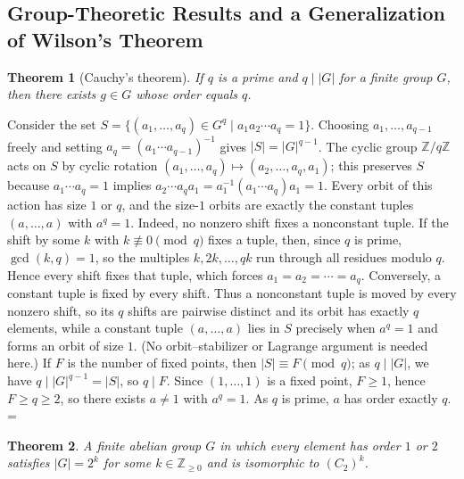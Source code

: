\documentclass[11pt]{article}
\makeatletter
\let\nt@closedisplay\]
\def\nt@guardedclose{\@ifnextchar\par{\nt@closeafterpar}{\@ifnextchar\end{\postdisplaypenalty\@M\nt@closedisplay}{\nt@closedisplay}}}
\def\nt@closeafterpar\par{\@ifnextchar\par{\nt@closeafterpar}{\@ifnextchar\end{\postdisplaypenalty\@M\nt@closedisplay\par}{\nt@closedisplay\par}}}
\renewenvironment{proof}[1][\proofname]{\par
  \pushQED{\qed}\normalfont\topsep\medskipamount\edef\nt@afterproof{\@endparpenalty=\the\@endparpenalty\relax}\@beginparpenalty\@M\@endparpenalty\@M\let\]\nt@guardedclose\trivlist\item[]\textit{#1\@addpunct{.}} \ignorespaces}{\ifvmode\addpenalty\@M\fi\popQED\nt@afterproof\endtrivlist\@endpefalse}
\theoremstyle{ntstyle}
\newtheorem{theorem}{Theorem}[subsection]
\makeatother
\begin{document}
\subsection{Group-Theoretic Results and a Generalization of Wilson's Theorem}

\begin{theorem}[Cauchy's theorem]\label{thm:6.7.1}\label{thm:cauchy-theorem}
  If $q$ is a
  prime and $q \mid |G|$ for a finite group $G$, then there exists $g \in G$ whose order equals $q$.

\end{theorem}

\begin{proof} Consider the set $S = \{(a_1, \ldots, a_q) \in G^{q} \mid a_1 a_2 \cdots a_q = 1\}$. Choosing $a_1, \ldots, a_{q-1}$ freely and setting $a_q = (a_1 \cdots a_{q-1})^{-1}$ gives
  $|S| = |G|^{q-1}$. The cyclic group $\mathbb{Z}/q\mathbb{Z}$ acts on $S$ by
  cyclic rotation $(a_1, \ldots, a_q) \mapsto (a_2, \ldots, a_q, a_1)$;
  this preserves $S$ because $a_1 \cdots a_q = 1$ implies $a_2 \cdots a_q a_1 = a_1^{-1}(a_1 \cdots a_q)a_1 = 1$.
  Every orbit of this action
  has size $1$ or $q$, and the size-$1$ orbits are exactly the constant
  tuples $(a, \ldots, a)$ with $a^{q} = 1$. Indeed, no nonzero shift fixes
  a nonconstant tuple. If the shift
  by some $k$ with $k \not\equiv 0 \pmod{q}$ fixes a tuple, then, since $q$
  is prime, $\gcd(k, q) = 1$, so the multiples $k, 2k, \ldots, qk$ run
  through all residues modulo $q$. Hence every shift fixes that tuple,
  which forces $a_1 = a_2 = \cdots = a_q$. Conversely, a constant
  tuple is fixed by every shift. Thus a nonconstant tuple is moved by
  every nonzero shift, so its $q$ shifts are pairwise distinct and its
  orbit has exactly $q$ elements, while a constant tuple $(a, \ldots, a)$
  lies in $S$ precisely when $a^{q} = 1$ and forms an orbit of size $1$.
  (No orbit--stabilizer or Lagrange argument is needed here.) If $F$ is the
  number of fixed points, then $|S| \equiv F \pmod{q}$; as $q \mid |G|$,
  we have $q \mid |G|^{q-1} = |S|$, so $q \mid F$. Since $(1, \ldots, 1)$ is a fixed point, $F \ge 1$, hence
  $F \ge q \ge 2$, so there
  exists $a \neq 1$ with $a^{q} = 1$. As $q$ is prime, $a$ has order
  exactly $q$.
\end{proof}

\begin{theorem}\label{thm:6.7.2} A finite abelian group $G$ in which
every element has order $1$ or $2$ satisfies $|G| = 2^{k}$ for some
$k\in\mathbb{Z}_{\ge0}$ and is isomorphic to $(C_2)^{k}$.

\end{theorem}
\end{document}
